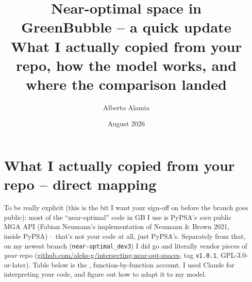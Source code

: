 \documentclass[11pt]{article}
\title{\textbf{Near-optimal space in GreenBubble -- a quick update}\\[2pt]
\large What I actually copied from your repo, how the model works, and where the comparison landed}
\author{Alberto Alamia}
\date{August 2026}
\begin{document}
\maketitle

\section{What I actually copied from your repo -- direct mapping}
\label{sec:mapping}
To be really explicit (this is the bit I want your sign-off on before the
branch goes public): most of the ``near-optimal'' code in GB I use is
PyPSA's \emph{own} public MGA API (Fabian Neumann's implementation of
Neumann \& Brown 2021, inside PyPSA) -- that's not your code at
all, just PyPSA's. Separately from that, on my newest branch
(\texttt{near-optimal\_dev3}) I did go and literally vendor pieces of
\emph{your} repo (\url{github.com/aleks-g/intersecting-near-opt-spaces},
tag \texttt{v1.0.1}, GPL-3.0-or-later). Table below is the ,
function-by-function account. I used Claude for interpreting your code,
and figure out how to adapt it to my model.
\end{document}
